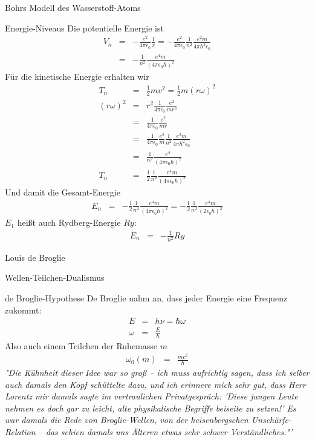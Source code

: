 \begin{chapter}{\titlestr}
\begin{section}{Bohrs Modell des Wasserstoff-Atoms}
\begin{subsection}{Energie-Niveaus}
Die potentielle Energie ist
\begin{eqnarray*}
V_n &=& -\frac{e^2}{4\pi\epsilon_0}\frac{1}{r}=-\frac{e^2}{4\pi\epsilon_0}\frac{1}{n^2}\frac{e^2m}{4\pi\hbar^2\epsilon_0}\\
&=& -\frac{1}{n^2}\frac{e^4m}{(4\pi\epsilon_0\hbar)^2}
\end{eqnarray*}
Für die kinetische Energie erhalten wir
\begin{eqnarray*}
T_n &=& \frac{1}{2}mv^2 =\frac{1}{2}m(r\omega)^2\\
(r\omega)^2 &=& r^2\frac{1}{4\pi\epsilon_0}\frac{e^2}{mr^3}\\
&=& \frac{1}{4\pi\epsilon_0}\frac{e^2}{mr}\\
&=& \frac{1}{4\pi\epsilon_0}\frac{e^2}{m}\frac{1}{n^2}\frac{e^2m}{4\pi\hbar^2\epsilon_0}\\
&=&\frac{1}{n^2}\frac{e^4}{(4\pi\epsilon_0\hbar)^2}\\
T_n &=& \frac{1}{2}\frac{1}{n^2}\frac{e^4m}{(4\pi\epsilon_0\hbar)^2}
\end{eqnarray*}
Und damit die Gesamt-Energie
\begin{eqnarray*}
E_n &=& -\frac{1}{2}\frac{1}{n^2}\frac{e^4m}{(4\pi\epsilon_0\hbar)^2} = -\frac{1}{2}\frac{1}{n^2}\frac{e^4m}{(2\epsilon_0 h)^2} 
\end{eqnarray*}
$E_1$ heißt auch Rydberg-Energie $Ry$:
\begin{eqnarray*}
E_n &=& -\frac{1}{n^2}Ry
\end{eqnarray*}

\end{subsection}
\end{section}

\begin{section}{Louis de Broglie}
\begin{subsection}{Wellen-Teilchen-Dualismus}
\end{subsection}
\begin{subsection}{de Broglie-Hypothese}
De Broglie nahm an, dass jeder Energie eine Frequenz zukommt:
\begin{eqnarray*}
E &=& h\nu = \hbar\omega\\
\omega &=& \frac{E}{\hbar}
\end{eqnarray*}
Also auch einem Teilchen der Ruhemasse $m$
\begin{eqnarray*}
\omega_0(m) &=& \frac{mc^2}{\hbar}
\end{eqnarray*}
\textit{"Die Kühnheit dieser Idee war so groß – ich muss aufrichtig sagen, dass ich selber auch damals den Kopf schüttelte dazu, und ich erinnere mich sehr gut, dass Herr Lorentz mir damals sagte im vertraulichen Privatgespräch: 'Diese jungen Leute nehmen es doch gar zu leicht, alte physikalische Begriffe beiseite zu setzen!' Es war damals die Rede von Broglie-Wellen, von der heisenbergschen Unschärfe-Relation – das schien damals uns Älteren etwas sehr schwer Verständliches."'}
\end{subsection}


\end{section}
\end{chapter}
